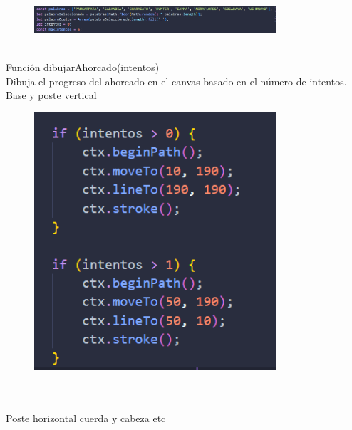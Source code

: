 \documentclass{article}
\begin{document}
\\
\\
\begin{figure}[H]
		          \centering
		          \includegraphics[width=0.8\textwidth,keepaspectratio]                       {img/varAh.png}
\end{figure}  
\\Función dibujarAhorcado(intentos)
\\Dibuja el progreso del ahorcado en el canvas basado en el número de intentos.
\\Base y poste vertical
\begin{figure}[H]
		          \centering
		          \includegraphics[width=0.8\textwidth,keepaspectratio]                       {img/baseAh.png}
    \end{figure}  
\\
\\Poste horizontal cuerda y cabeza etc
\end{document}

